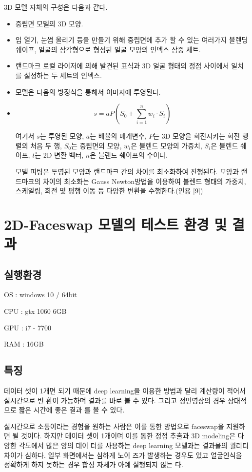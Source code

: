 \documentclass{oblivoir}
\begin{document}
3D 모델 자체의 구성은 다음과 같다.
\begin{itemize}[label = $--$]
    \item 중립면 모델의 3D 모양.
    \item 입 열기, 눈썹 올리기 등을 만들기 위해 중립면에 추가 할 수 있는 여러가지 블렌딩 쉐이프, 얼굴의 삼각형으로 형성된 얼굴 모양의 인덱스 삼중 세트.
    \item 랜드마크 로컬 라이저에 의해 발견된 표식과 3D 얼굴 형태의 정점 사이에서 일치를 설정하는 두 세트의 인덱스.
    \item 모델은 다음의 방정식을 통해서 이미지에 투영된다.
    \item 
    \[ s = aP \left( S_{0} + \sum_{i=1}^{n} w_{i}\cdot S_{i}  \right)   \]

    여기서 $s$는 투영된 모양, $a$는 배율의 매개변수, $P$는 3D 모양을 회전시키는 회전 행렬의 처음 두 행, $S_0$는 중립면의 모양, $w_i$은 블렌드 모양의 가중치, $S_i$은 블렌드 쉐이프, $t$는 2D 변환 벡터, $n$은 블렌드 쉐이프의 수이다.

    모델 피팅은 투영된 모양과 랜드마크 간의 차이를 최소화하여 진행된다. 모양과 랜드마크의 차이의 최소화는 Gauss Newton방법을 이용하여 블렌드 형태의 가중치, 스케일링, 회전 및 평행 이동 등 다양한 변환을 수행한다.(인용 [9])
\end{itemize}

\section{2D-Faceswap 모델의 테스트 환경 및 결과}

\subsection{실행환경}

 OS : windows 10 / 64bit

 CPU : gtx 1060 6GB

 GPU : i7 - 7700

 RAM : 16GB

\subsection{특징}

 데이터 셋이 1개면 되기 때문에 deep learning을 이용한 방법과 달리 계산량이 적어서 실시간으로 변 환이 가능하며 결과를 바로 볼 수 있다. 그리고 정면영상의 경우 상대적으로 짧은 시간에 좋은 결과 를 볼 수 있다.

 실시간으로 소통이라는 경험을 원하는 사람은 이를 통한 방법으로 faceswap을 지원하면 될 것이다.  하지만 데이터 셋이 1개이며 이를 통한 정점 추출과 3D modeling은 다양한 각도에서 많은 양의 데이 터를 사용하는 deep learning 모델과는 결과물의 퀄리티 차이가 심하다. 일부 화면에서는 심하게 노이 즈가 발생하는 경우도 있고 얼굴인식을 정확하게 하지 못하는 경우 합성 자체가 아예 실행되지 않는 다.
\end{document}
